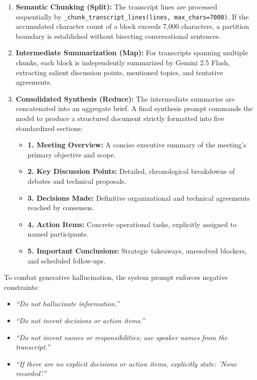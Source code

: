 \documentclass[12pt,oneside,letterpaper]{report}
\numberwithin{equation}{chapter} %
\begin{document}
\begin{enumerate}
    \item \textbf{Semantic Chunking (Split):} The transcript lines are processed sequentially by \texttt{\_chunk\_transcript\_lines(lines, max\_chars=7000)}. If the accumulated character count of a block exceeds 7,000 characters, a partition boundary is established without bisecting conversational sentences.
    \item \textbf{Intermediate Summarization (Map):} For transcripts spanning multiple chunks, each block is independently summarized by Gemini 2.5 Flash, extracting salient discussion points, mentioned topics, and tentative agreements.
    \item \textbf{Consolidated Synthesis (Reduce):} The intermediate summaries are concatenated into an aggregate brief. A final synthesis prompt commands the model to produce a structured document strictly formatted into five standardized sections:
    \begin{itemize}
        \item \textbf{1. Meeting Overview:} A concise executive summary of the meeting's primary objective and scope.
        \item \textbf{2. Key Discussion Points:} Detailed, chronological breakdowns of debates and technical proposals.
        \item \textbf{3. Decisions Made:} Definitive organizational and technical agreements reached by consensus.
        \item \textbf{4. Action Items:} Concrete operational tasks, explicitly assigned to named participants.
        \item \textbf{5. Important Conclusions:} Strategic takeaways, unresolved blockers, and scheduled follow-ups.
    \end{itemize}
\end{enumerate}

To combat generative hallucination, the system prompt enforces negative constraints:
\begin{itemize}
    \item \textit{``Do not hallucinate information.''}
    \item \textit{``Do not invent decisions or action items.''}
    \item \textit{``Do not invent names or responsibilities; use speaker names from the transcript.''}
    \item \textit{``If there are no explicit decisions or action items, explicitly state: 'None recorded'.''}
\end{itemize}
\end{document}
